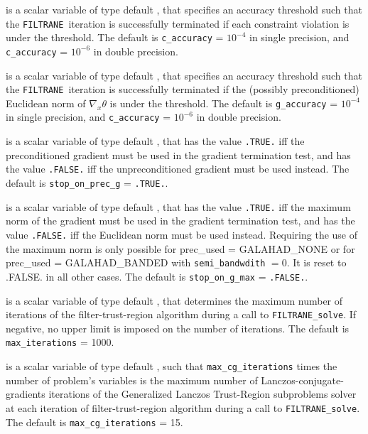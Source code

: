 \documentclass{galahad}
\newcommand{\packagename}{FILTRANE}
\newcommand{\sym}{\sf\small}
\newcommand{\filtrane}{{\tt \packagename}}
\begin{document}
\begin{description}
 is a scalar variable of type default \realdp, that
specifies an accuracy threshold such that the \filtrane\ iteration is
successfully terminated if each constraint violation is under the threshold.
The default is {\tt c\_accuracy} = $10^{-4}$ in single precision, and
{\tt c\_accuracy} = $10^{-6}$ in double precision.

 is a scalar variable of type default \realdp, that
specifies an accuracy threshold such that the \filtrane\ iteration is
successfully terminated if the (possibly preconditioned) Euclidean norm
of $\nabla_x \theta$ is under the threshold.
The default is {\tt g\_accuracy} = $10^{-4}$ in single precision, and
{\tt c\_accuracy} = $10^{-6}$ in double precision.

 is a scalar variable of type default \logical, that
has the value {\tt .TRUE.} iff the preconditioned gradient must be used 
in the gradient termination test, and has the value {\tt .FALSE.} iff the
unpreconditioned gradient must be used instead.
The default is {\tt stop\_on\_prec\_g} = {\tt .TRUE.}.

 is a scalar variable of type default \logical, that
has the value {\tt .TRUE.} iff the maximum norm of the gradient must be used 
in the gradient termination test, and has the value {\tt .FALSE.} iff the
Euclidean norm must be used instead. Requiring the use of the maximum norm
is only possible for {prec\_used} = {\sym GALAHAD\_NONE} or for
{prec\_used} = {\sym GALAHAD\_BANDED} with {\tt semi\_bandwdith} $= 0$.  It is
reset to .FALSE. in all other cases.
The default is {\tt stop\_on\_g\_max} = {\tt .FALSE.}.

 is a scalar variable of type default \integer, that
determines the maximum number of iterations of the filter-trust-region
algorithm during a call to {\tt \packagename\_solve}. If negative, no upper
limit is imposed on the number of iterations.
The default is {\tt max\_iterations} = 1000.

 is a scalar variable of type default \integer, such
that {\tt max\_cg\_iterations} times the number of problem's variables
is the maximum number of Lanczos-conjugate-gradients iterations of the 
Generalized Lanczos Trust-Region subproblems solver at each iteration of
filter-trust-region algorithm during a call to {\tt \packagename\_solve}.
The default is {\tt max\_cg\_iterations} = 15.


\end{description}
\end{document}
